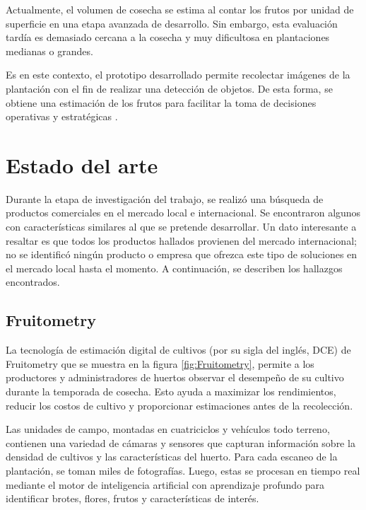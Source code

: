 Actualmente, el volumen de cosecha se estima al contar los frutos por unidad de superficie en una etapa avanzada de desarrollo. Sin embargo, esta evaluación tardía es demasiado cercana a la cosecha y muy dificultosa en plantaciones medianas o grandes.

Es en este contexto, el prototipo desarrollado permite recolectar imágenes de la plantación con el fin de realizar una detección de objetos. De esta forma, se obtiene una estimación de los frutos para facilitar la toma de decisiones operativas y estratégicas \citep{Mendoza2021}.


\section{Estado del arte}

Durante la etapa de investigación del trabajo, se realizó una búsqueda de productos comerciales en el mercado local e internacional. Se encontraron algunos con características similares al que se pretende desarrollar. Un dato interesante a resaltar es que todos los productos hallados provienen del mercado internacional; no se identificó ningún producto o empresa que ofrezca este tipo de soluciones en el mercado local hasta el momento. A continuación, se describen los hallazgos encontrados.

\subsection{Fruitometry}

La tecnología de estimación digital de cultivos (por su sigla del inglés, DCE) de Fruitometry que se muestra en la figura \ref{fig:Fruitometry}, permite a los productores y administradores de huertos observar el desempeño de su cultivo durante la temporada de cosecha. Esto ayuda a maximizar los rendimientos, reducir los costos de cultivo y proporcionar estimaciones antes de la recolección.

Las unidades de campo, montadas en cuatriciclos y vehículos todo terreno, contienen una variedad de cámaras y sensores que capturan información sobre la densidad de cultivos y las características del huerto. Para cada escaneo de la plantación, se toman miles de fotografías. Luego, estas se procesan en tiempo real mediante el motor de inteligencia artificial con aprendizaje profundo para identificar brotes, flores, frutos y características de interés.

